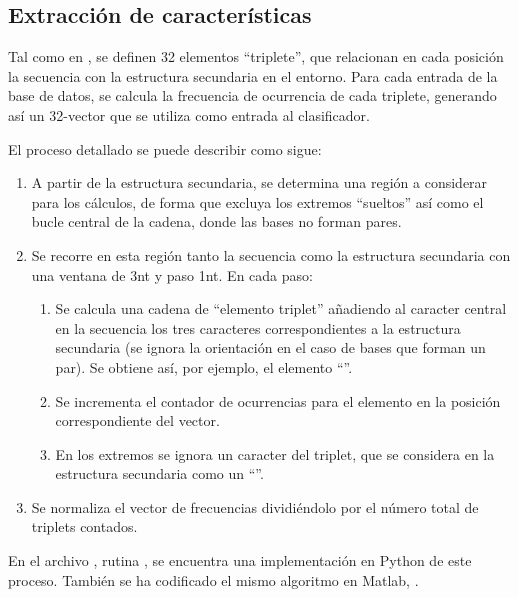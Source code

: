 \documentclass[12pt,bibliography=oldstyle,DIV=12,parskip=half-]{scrreprt}
\begin{document}
\subsection{Extracción de características}
%
Tal como en \cite{xue}, se definen 32 elementos ``triplete'', que
relacionan en cada posición la secuencia con la estructura secundaria
en el entorno. Para cada entrada de la base de datos, se calcula la
frecuencia de ocurrencia de cada triplete, generando así un 32-vector
que se utiliza como entrada al clasificador.


El proceso detallado se puede describir como sigue:
\begin{enumerate}
\item A partir de la estructura secundaria, se determina una región a
  considerar para los cálculos, de forma que excluya los extremos
  ``sueltos'' así como el bucle central de la cadena, donde las bases
  no forman pares.
\item Se recorre en esta región tanto la secuencia como la
  estructura secundaria con una ventana de 3nt y paso 1nt. En cada
  paso:
  \begin{enumerate}
  \item Se calcula una cadena de ``elemento triplet'' añadiendo al
    caracter central en la secuencia los tres caracteres
    correspondientes a la estructura secundaria (se ignora la
    orientación en el caso de bases que forman un par). Se obtiene
    así, por ejemplo, el elemento ``''.
  \item Se incrementa el contador de ocurrencias para el elemento en
    la posición correspondiente del vector.
  \item En los extremos se ignora un caracter del triplet, que se
    considera en la estructura secundaria como un ``''.
  \end{enumerate}
\item Se normaliza el vector de frecuencias dividiéndolo por el número
  total de triplets contados.
\end{enumerate}

En el archivo , rutina , se encuentra
una implementación en Python de este proceso. También se ha codificado
el mismo algoritmo en Matlab, .
%
\end{document}
